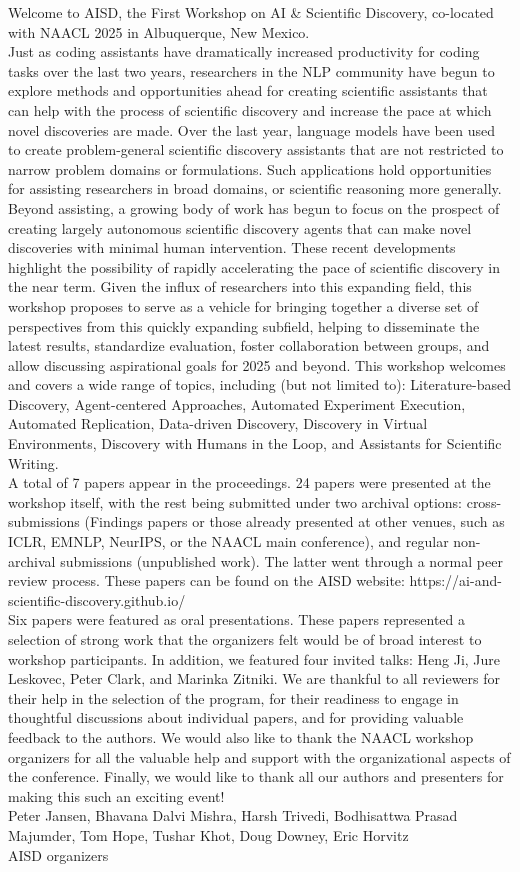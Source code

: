 Welcome to AISD, the First Workshop on AI & Scientific Discovery, co-located with NAACL 2025 in Albuquerque, New Mexico. \\

Just as coding assistants have dramatically increased productivity for coding tasks over the last two years, researchers in the NLP community have begun to explore methods and opportunities ahead for creating scientific assistants that can help with the process of scientific discovery and increase the pace at which novel discoveries are made. Over the last year, language models have been used to create problem-general scientific discovery assistants that are not restricted to narrow problem domains or formulations. Such applications hold opportunities for assisting researchers in broad domains, or scientific reasoning more generally. Beyond assisting, a growing body of work has begun to focus on the prospect of creating largely autonomous scientific discovery agents that can make novel discoveries with minimal human intervention.
These recent developments highlight the possibility of rapidly accelerating the pace of scientific discovery in the near term. Given the influx of researchers into this expanding field, this workshop proposes to serve as a vehicle for bringing together a diverse set of perspectives from this quickly expanding subfield, helping to disseminate the latest results, standardize evaluation, foster collaboration between groups, and allow discussing aspirational goals for 2025 and beyond. This workshop welcomes and covers a wide range of topics, including (but not limited to): Literature-based Discovery, Agent-centered Approaches, Automated Experiment Execution, Automated Replication, Data-driven Discovery, Discovery in Virtual Environments, Discovery with Humans in the Loop, and Assistants for Scientific Writing. \\

A total of 7 papers appear in the proceedings. 24 papers were presented at the workshop itself, with the rest being submitted under two archival options: cross-submissions (Findings papers or those already presented at other venues, such as ICLR, EMNLP, NeurIPS, or the NAACL main conference), and regular non-archival submissions (unpublished work). The latter went through a normal peer review process. These papers can be found on the AISD website: https://ai-and-scientific-discovery.github.io/ \\

Six papers were featured as oral presentations. These papers represented a selection of strong work that the organizers felt would be of broad interest to workshop participants. In addition, we featured four invited talks: Heng Ji, Jure Leskovec, Peter Clark, and Marinka Zitniki.
We are thankful to all reviewers for their help in the selection of the program, for their readiness to engage in thoughtful discussions about individual papers, and for providing valuable feedback to the authors. We would also like to thank the NAACL workshop organizers for all the valuable help and support with the organizational aspects of the conference. Finally, we would like to thank all our authors and presenters for making this such an exciting event! \\

Peter Jansen, Bhavana Dalvi Mishra, Harsh Trivedi, Bodhisattwa Prasad Majumder, Tom Hope, Tushar Khot, Doug Downey, Eric Horvitz\\
AISD organizers
